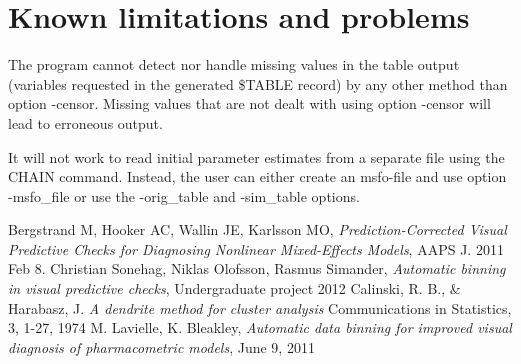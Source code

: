 \section{Known limitations and problems}
The program cannot detect nor handle missing values in the table output (variables 
requested in the generated \$TABLE record) by any other method than option -censor. Missing values that are not dealt with using option -censor will lead to erroneous output. 

It will not work to read initial parameter estimates from a separate file using the CHAIN command. Instead, the user can either create an msfo-file and use option -msfo\_file or use the -orig\_table and -sim\_table options.


\begin{thebibliography}{1}
 Bergstrand M, Hooker AC, Wallin JE, Karlsson MO, {\em Prediction-Corrected Visual Predictive Checks for Diagnosing Nonlinear Mixed-Effects Models}, AAPS J. 2011 Feb 8.
 Christian Sonehag, Niklas Olofsson, Rasmus Simander, {\em Automatic binning in visual predictive checks}, Undergraduate project 2012
 Calinski, R. B., \& Harabasz, J. {\em A dendrite method for cluster analysis} Communications in Statistics, 3, 1-27, 1974
 M. Lavielle, K. Bleakley, {\em Automatic data binning for improved visual diagnosis of pharmacometric models}, June 9, 2011
\end{thebibliography}



